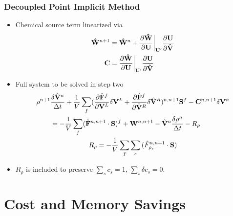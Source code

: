 \documentclass{beamer}
\begin{document}
\begin{frame}
  \frametitle{Decoupled Point Implicit Method}
  \begin{itemize}
    \item Chemical source term linearized via
    \begin{align*}
      \mathbf{\hat{W}}^{n+1} &= \mathbf{\hat{W}}^n+\frac{\partial
      \mathbf{\hat{W}}}{\partial \mathbf{U}}\bigg|_{\mathbf{U}'} \frac{\partial
      \mathbf{U}}{\partial \mathbf{\hat{V}}} \\
       {\bf C} &= \frac{\partial \mathbf{\hat{W}}}{\partial
       \mathbf{U}}\bigg|_{\mathbf{U}'} \frac{\partial \mathbf{U}}{\partial
       \mathbf{\hat{V}}}
    \end{align*}
    \item Full system to be solved in step two
    \begin{gather*}
      \begin{split} \rho^{n+1}&\frac{\delta \hat{{\bf V}}^n}{\Delta t}
        +\frac{1}{V}\sum\limits_{f}(\frac{\partial \hat{{\bf F}}^f}{\partial
        {\bf V}^L}\delta {\bf V}^L +\frac{\partial
        \hat{{\bf F}}^f}{\partial \hat{{\bf V}}^R}\delta
        \hat{{\bf V}}^R)^{n, n+1}{\bf S}^f - {\bf C}^{n, n+1}\delta{\bf V}^n \\ &=
        -\frac{1}{V}\sum\limits_{f}(\hat{{\bf F}}^{n,n+1}\cdot{\bf S})^f +
        {\bf W}^{n, n+1} -\hat{{\bf V}}^n\frac{\delta \rho^n}{\Delta t} - R_\rho 
      \end{split} \\ 
      R_\rho = -\frac{1}{V}\sum\limits_{f}{\sum\limits_{s}
      {(\hat{F}_{\rho_s}^{n,n+1}\cdot\mathbf{S})}}
    \end{gather*}
  \item $R_\rho$ is included to preserve $\sum\limits_{s}{c_s}=1$, $\sum\limits_{s}{\delta c_s}=0$.
  \end{itemize}
\end{frame}

\section{Cost and Memory Savings}
\end{document}
